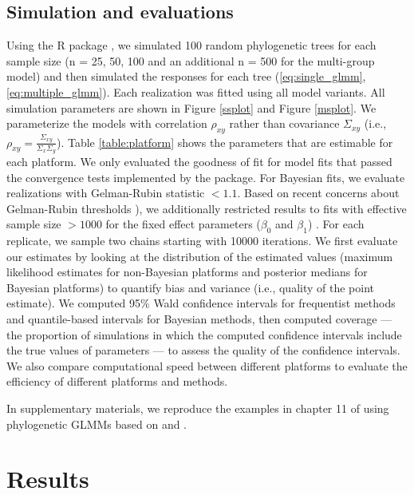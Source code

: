 \documentclass[12pt]{article}
\begin{document}
\subsection*{Simulation and evaluations}

Using the R package  \citep{ape}, we simulated 100 random phylogenetic trees  for each sample size (n = 25, 50, 100 and an additional n = 500 for the multi-group model) and then simulated the responses for each tree (\ref{eq:single_glmm}, \ref{eq:multiple_glmm}). 
Each realization was fitted using all model variants. 
All simulation parameters are shown in Figure \ref{ssplot} and Figure \ref{msplot}. 
We parameterize the models with correlation $\rho_{xy}$ rather than covariance $\Sigma_{xy}$ (i.e., $\rho_{xy} = \frac{\Sigma_{xy}}{\Sigma_{x}\Sigma_{y}}$).
Table \ref{table:platform} shows the parameters that are estimable for each platform. 
We only evaluated the goodness of fit for model fits that passed the convergence tests implemented by the package.
For Bayesian fits, we evaluate realizations with Gelman-Rubin statistic $<1.1$. Based on recent concerns about Gelman-Rubin thresholds \citep{vats2018revisiting}), we additionally restricted results to fits with  effective sample size $>1000$ for the fixed effect parameters ($\beta_{0}$ and $\beta_{1}$) \citep{vehtari2019rank}. 
For each replicate, we sample two chains starting with 10000 iterations. 
We first evaluate our estimates by looking at the distribution of the estimated values (maximum likelihood estimates for non-Bayesian platforms and posterior medians for Bayesian platforms) to quantify bias and variance (i.e., quality of the point estimate).
We computed 95\% Wald confidence intervals for frequentist methods and quantile-based intervals for Bayesian methods, then computed coverage --- the proportion of simulations in which the computed confidence intervals include the true values of parameters --- to assess the quality of the confidence intervals.
We also compare computational speed between different platforms to evaluate the efficiency of different platforms and methods. 

In supplementary materials, we reproduce the examples in chapter 11 of \cite{garamszegi2014modern} using phylogenetic GLMMs based on  and .

\section*{Results}
\end{document}
